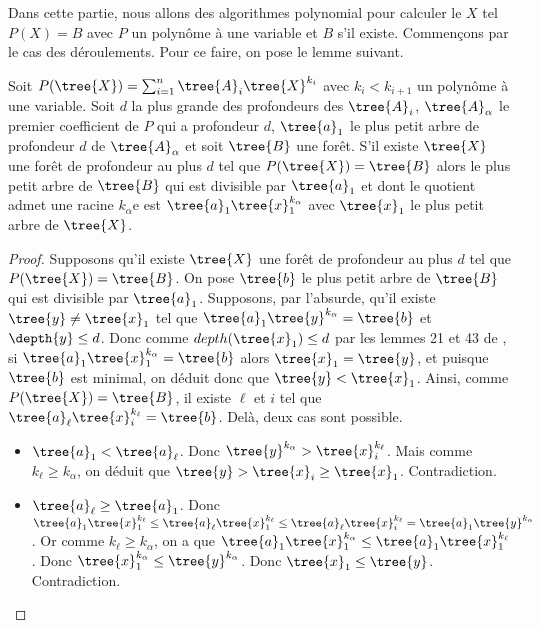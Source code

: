 Dans cette partie, nous allons des algorithmes polynomial pour calculer le $X$ tel $P(X) = B$ avec $P$ un polynôme à une variable et $B$ s'il existe.
Commençons par le cas des déroulements.
Pour ce faire, on pose le lemme suivant.

\begin{lemma}\label{lemme:baseAlgoRaisoEquaPoly}
	Soit $P(\tree{X}) = \sum_{i=1}^{n} \tree{A}_i\tree{X}^{k_i}$ avec $k_i < k_{i+1}$ un polynôme à une variable.
	Soit $d$ la plus grande des profondeurs des $\tree{A}_i$, $\tree{A}_\alpha$ le premier coefficient de $P$ qui a profondeur $d$, $\tree{a}_1$ le plus petit arbre de profondeur $d$ de $\tree{A}_\alpha$ et soit $\tree{B}$ une forêt.
	S'il existe $\tree{X}$ une forêt de profondeur au plus $d$ tel que $P(\tree{X}) = \tree{B}$ alors le plus petit arbre de $\tree{B}$ qui est divisible par $\tree{a}_1$ et dont le quotient admet une racine $k_\alpha$e est $\tree{a}_1 \tree{x}_1^{k_\alpha}$ avec $\tree{x}_1$ le plus petit arbre de $\tree{X}$.
\end{lemma}

\begin{proof}
	Supposons qu'il existe $\tree{X}$ une forêt de profondeur au plus $d$ tel que $P(\tree{X}) = \tree{B}$.
	On pose $\tree{b}$ le plus petit arbre de $\tree{B}$ qui est divisible par $\tree{a}_1$. 
	Supposons, par l'absurde, qu'il existe $\tree{y} \neq \tree{x}_1$ tel que $\tree{a}_1 \tree{y}^{k_\alpha} = \tree{b}$ et $\depth{y} \le d$.
	Donc comme $depth(\tree{x}_1) \le d$ par les lemmes 21 et 43 de \cite{1}, si $\tree{a}_1 \tree{x}_1^{k_\alpha} = \tree{b}$ alors $\tree{x}_1 = \tree{y}$, et puisque $\tree{b}$ est minimal, on déduit donc que $\tree{y} < \tree{x}_1$.
	Ainsi, comme $P(\tree{X}) = \tree{B}$, il existe $\ell$ et $i$ tel que $\tree{a}_\ell \tree{x}_i^{k_\ell} = \tree{b}$.
	Delà, deux cas sont possible.
	\begin{itemize}
		\item $\tree{a}_1 < \tree{a}_\ell$. 
		Donc $\tree{y}^{k_\alpha} > \tree{x}_i^{k_\ell}$.
		Mais comme $k_\ell \ge k_\alpha$, on déduit que $\tree{y} > \tree{x}_i \ge \tree{x}_1$. Contradiction.
		
		\item $\tree{a}_\ell \ge \tree{a}_1$. 
		Donc $\tree{a}_1 \tree{x}_1^{k_\ell} \le \tree{a}_\ell \tree{x}_1^{k_\ell} \le \tree{a}_\ell \tree{x}_i^{k_\ell} = \tree{a}_1 \tree{y}^{k_\alpha}$.
		Or comme $k_\ell \ge k_\alpha$, on a que $\tree{a}_1 \tree{x}_1^{k_\alpha} \le \tree{a}_1 \tree{x}_1^{k_\ell}$.
		Donc $\tree{x}_1^{k_\alpha} \le \tree{y}^{k_\alpha}$. 
		Donc $\tree{x}_1 \le \tree{y}$.
		Contradiction.
	\end{itemize}
\end{proof}